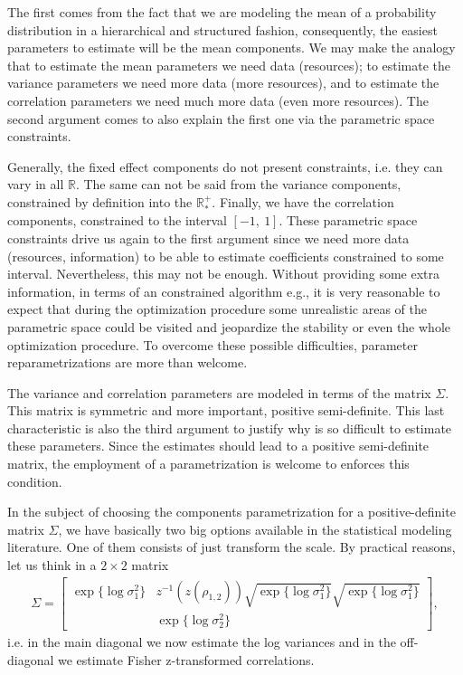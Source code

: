 The first comes from the fact that we are modeling the mean of a
probability distribution in a hierarchical and structured fashion,
consequently, the easiest parameters to estimate will be the mean
components. We may make the analogy that to estimate the mean parameters
we need data (resources); to estimate the variance parameters we need
more data (more resources), and to estimate the correlation parameters
we need much more data (even more resources). The second argument comes
to also explain the first one via the parametric space constraints.

Generally, the fixed effect components do not present constraints, i.e.
they can vary in all \(\mathbb{R}\). The same can not be said from the
variance components, constrained by definition into the
\(\mathbb{R}_{\ast}^{+}\). Finally, we have the correlation components,
constrained to the interval \([-1,~1]\). These parametric space
constraints drive us again to the first argument since we need more data
(resources, information) to be able to estimate coefficients constrained
to some interval. Nevertheless, this may not be enough. Without
providing some extra information, in terms of an constrained algorithm
e.g., it is very reasonable to expect that during the optimization
procedure some unrealistic areas of the parametric space could be
visited and jeopardize the stability or even the whole optimization
procedure. To overcome these possible difficulties, parameter
reparametrizations are more than welcome.

The variance and correlation parameters are modeled in terms of the
matrix \(\Sigma\). This matrix is symmetric and more important, positive
semi-definite. This last characteristic is also the third argument to
justify why is so difficult to estimate these parameters. Since the
estimates should lead to a positive semi-definite matrix, the employment
of a parametrization is welcome to enforces this condition.

In the subject of choosing the components parametrization for a
positive-definite matrix \(\Sigma\), we have basically two big options
available in the statistical modeling literature. One of them consists
of just transform the scale. By practical reasons, let us think in a
\(2\times 2\) matrix
\begin{align*}
 \Sigma = \begin{bmatrix}
           \exp\{\log\sigma_{1}^{2}\}&
           z^{-1}(z(\rho_{1,2}))
           \sqrt{\exp\{\log\sigma_{1}^{2}\}}
           \sqrt{\exp\{\log\sigma_{1}^{2}\}}\\
           &\exp\{\log\sigma_{2}^{2}\}
          \end{bmatrix},
\end{align*}
i.e. in the main diagonal we now estimate the log variances and in the
off-diagonal we estimate Fisher z-transformed correlations.

